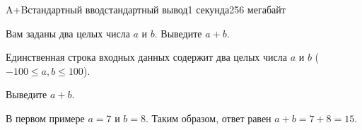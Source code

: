 \begin{problem}{A+B}{стандартный ввод}{стандартный вывод}{1 секунда}{256 мегабайт}

Вам заданы два целых числа $a$ и $b$. Выведите $a+b$.

\InputFile
Единственная строка входных данных содержит два целых числа $a$ и $b$ ($-100 \le a,b \le 100$).

\OutputFile
Выведите $a+b$.

\Examples

\begin{example}
%
%
%
\end{example}

\Note
В первом примере $a=7$ и $b=8$. Таким образом, ответ равен $a+b=7+8=15$.

\end{problem}

